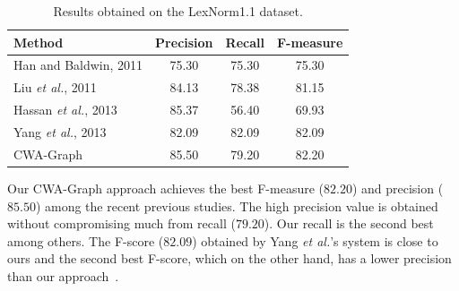\documentclass[a4paper,onesided,12pt]{report}
\begin{document}
\begin{table}[thb]
  \caption{Results obtained on the LexNorm1.1 dataset.}
  \centering
  \begin{tabular}[t]{|l|c|c|c|}
    \hline
    \textbf{Method} & \textbf{Precision} & \textbf{Recall} & \textbf{F-measure} \\
    \hline
    Han and Baldwin, 2011 & 75.30 & 75.30 & 75.30 \\\hline
    Liu \textit{et al.}, 2011 & 84.13 & 78.38 & 81.15 \\\hline
    Hassan \textit{et al.}, 2013 & 85.37 & 56.40 & 69.93 \\\hline
    Yang \textit{et al.}, 2013 & 82.09 & 82.09 & 82.09 \\\hline
    CWA-Graph   & 85.50 & 79.20 & 82.20 \\
    \hline
  \end{tabular}
  \label{tab:results}
\end{table}

Our CWA-Graph approach achieves the best F-measure ($82.20$) and precision ($85.50$) among the recent previous studies. The high precision value is obtained without compromising much from recall ($79.20$). Our recall is the second best among others. The F-score ($82.09$) obtained by Yang \textit{et al.}'s system is close to ours and the second best F-score, which on the other hand, has a lower precision than our approach~\cite{DBLP:conf/emnlp/YangE13}.
\end{document}
